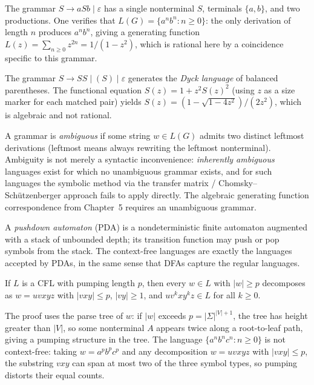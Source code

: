 \begin{example}
The grammar $S \to aSb \mid \varepsilon$ has a single nonterminal $S$, terminals $\{a, b\}$, and two productions. One verifies that $L(G) = \{a^n b^n : n \ge 0\}$: the only derivation of length $n$ produces $a^n b^n$, giving a generating function $L(z) = \sum_{n \ge 0} z^{2n} = 1/(1-z^2)$, which is rational here by a coincidence specific to this grammar.
\end{example}

\begin{example}
The grammar $S \to SS \mid (S) \mid \varepsilon$ generates the \emph{Dyck language} of balanced parentheses. The functional equation $S(z) = 1 + z^2 S(z)^2$ (using $z$ as a size marker for each matched pair) yields $S(z) = (1 - \sqrt{1-4z^2})/(2z^2)$, which is algebraic and not rational.
\end{example}

A grammar is \emph{ambiguous} if some string $w \in L(G)$ admits two distinct leftmost derivations (leftmost means always rewriting the leftmost nonterminal). Ambiguity is not merely a syntactic inconvenience: \emph{inherently ambiguous} languages exist for which no unambiguous grammar exists, and for such languages the symbolic method via the transfer matrix / Chomsky--Schützenberger approach fails to apply directly. The algebraic generating function correspondence from Chapter~5 requires an unambiguous grammar.

A \emph{pushdown automaton} (PDA) is a nondeterministic finite automaton augmented with a stack of unbounded depth; its transition function may push or pop symbols from the stack. The context-free languages are exactly the languages accepted by PDAs, in the same sense that DFAs capture the regular languages.

\begin{theorem}
If $L$ is a CFL with pumping length $p$, then every $w \in L$ with $|w| \ge p$ decomposes as $w = uvxyz$ with $|vxy| \le p$, $|vy| \ge 1$, and $uv^k x y^k z \in L$ for all $k \ge 0$.
\end{theorem}

The proof uses the parse tree of $w$: if $|w|$ exceeds $p = |\Sigma|^{|V|+1}$, the tree has height greater than $|V|$, so some nonterminal $A$ appears twice along a root-to-leaf path, giving a pumping structure in the tree. The language $\{a^n b^n c^n : n \ge 0\}$ is not context-free: taking $w = a^p b^p c^p$ and any decomposition $w = uvxyz$ with $|vxy| \le p$, the substring $vxy$ can span at most two of the three symbol types, so pumping distorts their equal counts.

